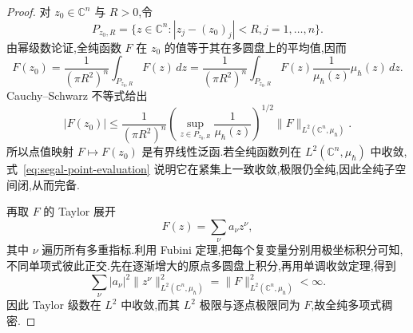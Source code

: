 \begin{proof}
对 $z_0\in\mathbb C^n$ 与 $R>0$,令
\[
P_{z_0,R}=\{z\in\mathbb C^n:|z_j-(z_0)_j|<R, j=1,\ldots,n\}.
\]
由幂级数论证,全纯函数 $F$ 在 $z_0$ 的值等于其在多圆盘上的平均值,因而
\[
F(z_0)=\frac1{(\pi R^2)^n}\int_{P_{z_0,R}}F(z)\,dz
=\frac1{(\pi R^2)^n}\int_{P_{z_0,R}}F(z)\frac1{\mu_\hbar(z)}\mu_\hbar(z)\,dz.
\]
Cauchy--Schwarz 不等式给出
\[
|F(z_0)|\leq\frac1{(\pi R^2)^n}
\left(\sup_{z\in P_{z_0,R}}\frac1{\mu_\hbar(z)}\right)^{1/2}
\|F\|_{L^2(\mathbb C^n,\mu_\hbar)}.
\label{eq:segal-point-evaluation}
\]
所以点值映射 $F\mapsto F(z_0)$ 是有界线性泛函.若全纯函数列在 $L^2(\mathbb C^n,\mu_\hbar)$ 中收敛,式~\eqref{eq:segal-point-evaluation} 说明它在紧集上一致收敛,极限仍全纯,因此全纯子空间闭,从而完备.

再取 $F$ 的 Taylor 展开
\[
F(z)=\sum_\nu a_\nu z^\nu,
\label{eq:segal-taylor}
\]
其中 $\nu$ 遍历所有多重指标.利用 Fubini 定理,把每个复变量分别用极坐标积分可知,不同单项式彼此正交.先在逐渐增大的原点多圆盘上积分,再用单调收敛定理,得到
\[
\sum_\nu|a_\nu|^2\|z^\nu\|_{L^2(\mathbb C^n,\mu_\hbar)}^2
=\|F\|_{L^2(\mathbb C^n,\mu_\hbar)}^2<\infty.
\]
因此 Taylor 级数在 $L^2$ 中收敛,而其 $L^2$ 极限与逐点极限同为 $F$,故全纯多项式稠密.
\end{proof}

\ChapterFourteenSegalLater
